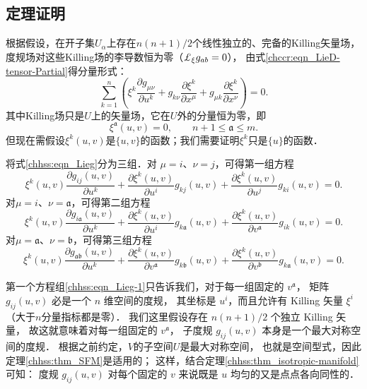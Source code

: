 \subsection{定理证明}

根据假设，在开子集$U_\alpha$上存在$n(n+1)/2$个线性独立的、完备的Killing矢量场，
度规场对这些Killing场的李导数恒为零（$\Lie_{\xi} g_{ab}=0$），
由式\eqref{chccr:eqn_LieD-tensor-Partial}得分量形式：
\begin{equation}\label{chhss:eqn_Lieg}
    \sum_{k=1}^{n} \left( \xi^k \frac{\partial g_{\mu\nu}}{\partial u^k}
    + g_{k \nu} \frac{\partial \xi^k}{\partial x^\mu }  
    + g_{\mu k} \frac{\partial \xi^k}{\partial x^\nu } \right)=0 . 
\end{equation}
其中Killing场只是$U$上的矢量场，它在$U$外的分量恒为零，即
\begin{equation}
    \xi^{\mathfrak{a}}(u, v)=0,\qquad  n+1 \leqslant \mathfrak{a} \leqslant m.
\end{equation}
但现在需假设$\xi^k(u,v)$是$\{u,v\}$的函数；我们需要证明$\xi^k$只是$\{u\}$的函数．

将式\eqref{chhss:eqn_Lieg}分为三组．对 $\mu=i$、$\nu=j$，可得第一组方程
\begin{equation}\label{chhss:eqn_Lieg-1}
    \xi^k(u, v) \frac{\partial g_{i j}(u, v)}{\partial u^k}
    +\frac{\partial \xi^k(u, v)}{\partial u^i} g_{k j}(u, v)
    +\frac{\partial \xi^k(u, v)}{\partial u^j} g_{k i}(u, v)   = 0 .
\end{equation}
对$\mu=i$、$\nu=\mathfrak{a}$，可得第二组方程
\begin{equation}\label{chhss:eqn_Lieg-2}
    \xi^k(u, v) \frac{\partial g_{i \mathfrak{a}}(u, v)}{\partial u^k}
    +\frac{\partial \xi^k(u, v)}{\partial u^i} g_{k \mathfrak{a}}(u, v)
    +\frac{\partial \xi^k(u, v)}{\partial v^{\mathfrak{a}}} g_{i k}(u, v)  = 0 .
\end{equation}
对$\mu=\mathfrak{a}$、$\nu=\mathfrak{b}$，可得第三组方程
\begin{equation}\label{chhss:eqn_Lieg-3}
    \xi^k(u, v) \frac{\partial g_{\mathfrak{ab}}(u, v)}{\partial u^k} 
    +\frac{\partial \xi^k(u, v)}{\partial v^{\mathfrak{a}}} g_{k \mathfrak{b}}(u, v)
    +\frac{\partial \xi^k(u, v)}{\partial v^{\mathfrak{b}}} g_{k \mathfrak{a}}(u, v) = 0 .
\end{equation}


第一个方程组\eqref{chhss:eqn_Lieg-1}只告诉我们，对于每一组固定的 $v^{\mathfrak{a}}$，
矩阵$ g_{i j}(u, v)$ 必是一个 $n$ 维空间的度规，
其坐标是 $u^i$，而且允许有 Killing 矢量 $\xi^i$（大于$n$分量指标都是零）．
我们这里假设存在 $n(n+1) / 2$ 个独立 Killing 矢量，
故这就意味着对每一组固定的 $v^{\mathfrak{a}}$， 
子度规 $g_{i j}(u, v)$ 本身是一个最大对称空间的度规．
根据之前约定，$V$的子空间$U$是最大对称空间，
也就是空间型式，因此定理\ref{chhss:thm_SFM}是适用的；
这样，结合定理\ref{chhss:thm_isotropic-manifold}可知：
度规 $g_{i j}(u, v)$ 对每个固定的 $v$ 来说既是 $u$ 均匀的又是点点各向同性的．

